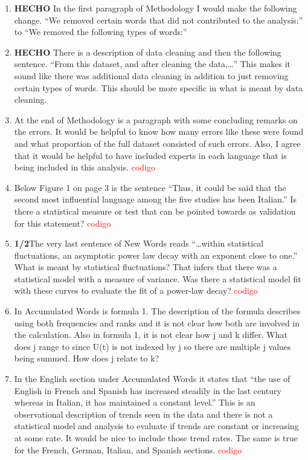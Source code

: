 \documentclass{article}
\begin{document}
\begin{enumerate}
		\item \textbf{HECHO}  In the first paragraph of Methodology I would make the following
		change. “We removed certain words that did not contributed to the
		analysis:” to “We removed the following types of words:”
		
		\item  \textbf{HECHO} There is a description of data cleaning and then the following
		sentence. “From this dataset, and after cleaning the data,…” This
		makes it sound like there was additional data cleaning in addition to
		just removing certain types of words. This should be more specific in
		what is meant by data cleaning.
		
		\item At the end of Methodology is a paragraph with some concluding
		remarks on the errors. It would be helpful to know how many errors
		like these were found and what proportion of the full dataset
		consisted of such errors. Also, I agree that it would be helpful to
		have included experts in each language that is being included in this
		analysis. \textcolor{red}{codigo}
		
		\item Below Figure 1 on page 3 is the sentence “Thus, it could be said
		that the second most influential language among the five studies has
		been Italian.” Is there a statistical measure or test that can be
		pointed towards as validation for this statement? \textcolor{red}{codigo}
		
		\item \textbf{1/2}The very last sentence of New Words reads “…within statistical
		fluctuations, an asymptotic power law decay with an exponent close to
		one.” What is meant by statistical fluctuations? That infers that
		there was a statistical model with a measure of variance. Was there a
		statistical model fit with these curves to evaluate the fit of a
		power-law decay? \textcolor{red}{codigo}
		
		\item  In Accumulated Words is formula 1. The description of the formula
		describes using both frequencies and ranks and it is not clear how
		both are involved in the calculation. Also in formula 1, it is not
		clear how j and k differ. What does j range to since U(t) is not
		indexed by j so there are multiple j values being summed. How does j
		relate to k?
		
		\item In the English section under Accumulated Words it states that “the
		use of English in French and Spanish has increased steadily in the
		last century whereas in Italian, it has maintained a constant level.”
		This is an observational description of trends seen in the data and
		there is not a statistical model and analysis to evaluate if trends
		are constant or increasing at some rate. It would be nice to include
		those trend rates. The same is true for the French, German, Italian,
		and Spanish sections. \textcolor{red}{codigo}
		

\end{enumerate}
\end{document}
